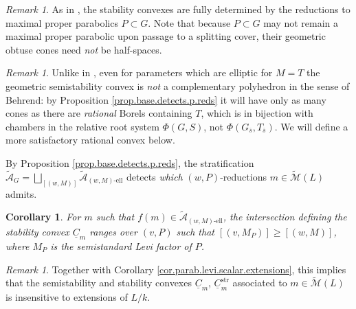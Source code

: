 \documentclass[openany]{amsbook}
\newtheorem{corollary}[theorem]{Corollary}
\theoremstyle{definition}
\theoremstyle{remark}
\newtheorem{remark}[theorem]{Remark}
\numberwithin{equation}{section}
\newcommand{\cA}{\mathcal{A}}
\newcommand{\cM}{\mathcal{M}}
\newcommand{\ol}[1]{\overline{#1}}
\newcommand{\ul}[1]{\underline{#1}}
\renewcommand{\-}{\operatorname{-}}
\newcommand{\str}{\mathrm{str}}
\newcommand{\el}{\text{-ell}}
\newcommand{\ctM}{\widetilde{\cM}}
\newcommand{\ctA}{\widetilde{\cA}}
\newcommand{\ctAe}[2]{\ctA_{(#1, #2)\el}}
\begin{document}
\begin{remark}
    As in \cite[Lemme 5.5.2]{CLI}, the stability convexes are fully determined by the reductions to maximal proper parabolics $P \subset G$. Note that because $P \subset G$ may not remain a maximal proper parabolic upon passage to a splitting cover, their geometric obtuse cones need \emph{not} be half-spaces.
\end{remark}

\begin{remark}
    Unlike in \cite{CLI}, even for parameters which are elliptic for $M = T$ the geometric semistability convex is \emph{not} a complementary polyhedron in the sense of Behrend: by Proposition \ref{prop.base.detects.p.reds} it will have only as many cones as there are \emph{rational} Borels containing $T$, which is in bijection with chambers in the relative root system $\Phi(G, S)$, not $\Phi(G_{\ol{s}}, T_{\ol{s}})$. We will define a more satisfactory rational convex below.
\end{remark}



By Proposition \ref{prop.base.detects.p.reds}, the stratification $\ctA_G = \bigsqcup_{[(w,M)]} \ctAe{w}{M}$ detects \textit{which} $(w,P)$-reductions $m \in \ctM(L)$ admits. 
\begin{corollary}
    For $m$ such that $f(m) \in \ctAe{w}{M}$, the intersection defining the stability convex $\ul{C}_m$ ranges over $(v,P)$ such that $[(v,M_P)] \ge [(w,M)]$, where $M_P$ is the semistandard Levi factor of $P$.
\end{corollary}

\begin{remark}\label{rmk.stab.convex.stable.extensions}
    Together with Corollary \ref{cor.parab.levi.scalar.extensions}, this implies that the semistability and stability convexes $\ul{C}_m$, $\ul{C}_m^{\str}$ associated to $m \in \ctM(L)$ is insensitive to extensions of $L/k$. 
\end{remark}
\end{document}
